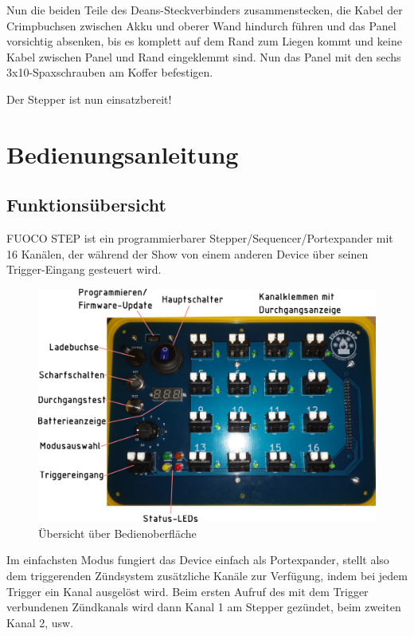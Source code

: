 \documentclass[paper=a4, open=any, numbers=noenddot]{scrbook}
\begin{document}
			Nun die beiden Teile des Deans-Steckverbinders zusammenstecken, die Kabel der Crimpbuchsen zwischen Akku und oberer Wand hindurch führen und das Panel vorsichtig absenken, bis es komplett auf dem Rand zum Liegen kommt und keine Kabel zwischen Panel und Rand eingeklemmt sind. Nun das Panel mit den sechs 3x10-Spaxschrauben am Koffer befestigen.

			\begin{center}
				Der Stepper ist nun einsatzbereit!
			\end{center}

			\cleardoublepage
\part{Bedienungsanleitung}

	\chapter{Funktionsübersicht}

		FUOCO STEP ist ein programmierbarer Stepper/Sequencer/Portexpander mit 16 Kanälen, der während der Show von einem anderen Device über seinen Trigger-Eingang gesteuert wird.

		\begin{figure}[!b]
			\centering\includegraphics[width=\textwidth]{oberflaeche}
			\caption{Übersicht über Bedienoberfläche}
			\label{fig:paneldescription}
		\end{figure}

		Im einfachsten Modus fungiert das Device einfach als Portexpander, stellt also dem triggerenden Zündsystem zusätzliche Kanäle zur Verfügung, indem bei jedem Trigger ein Kanal ausgelöst wird. Beim ersten Aufruf des mit dem Trigger verbundenen Zündkanals wird dann Kanal 1 am Stepper gezündet, beim zweiten Kanal 2, usw.
\end{document}
